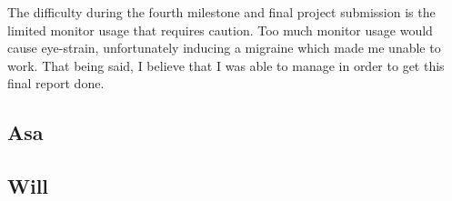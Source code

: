\documentclass{article}
\begin{document}
The difficulty during the fourth milestone and final project submission is the limited monitor usage that requires caution. Too much monitor usage would cause eye-strain, unfortunately inducing a migraine which made me unable to work. That being said, I believe that I was able to manage in order to get this final report done.

\subsection{Asa}


\subsection{Will}



\nocite{*}


\end{document}
